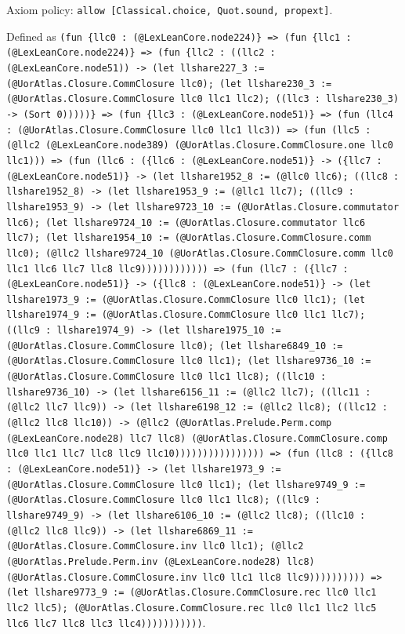 \documentclass[11pt]{article}
\begin{document}
\noindent Axiom policy: \texttt{allow [Classical.choice, Quot.sound, propext]}.\par
\noindent Defined as \texttt{(fun \{llc0 : (@LexLeanCore.node224)\} => (fun \{llc1 : (@LexLeanCore.node224)\} => (fun \{llc2 : ((llc2 : (@LexLeanCore.node51)) -> (let llshare227\_3 := (@UorAtlas.Closure.CommClosure llc0); (let llshare230\_3 := (@UorAtlas.Closure.CommClosure llc0 llc1 llc2); ((llc3 : llshare230\_3) -> (Sort 0)))))\} => (fun \{llc3 : (@LexLeanCore.node51)\} => (fun (llc4 : (@UorAtlas.Closure.CommClosure llc0 llc1 llc3)) => (fun (llc5 : (@llc2 (@LexLeanCore.node389) (@UorAtlas.Closure.CommClosure.one llc0 llc1))) => (fun (llc6 : (\{llc6 : (@LexLeanCore.node51)\} -> (\{llc7 : (@LexLeanCore.node51)\} -> (let llshare1952\_8 := (@llc0 llc6); ((llc8 : llshare1952\_8) -> (let llshare1953\_9 := (@llc1 llc7); ((llc9 : llshare1953\_9) -> (let llshare9723\_10 := (@UorAtlas.Closure.commutator llc6); (let llshare9724\_10 := (@UorAtlas.Closure.commutator llc6 llc7); (let llshare1954\_10 := (@UorAtlas.Closure.CommClosure.comm llc0); (@llc2 llshare9724\_10 (@UorAtlas.Closure.CommClosure.comm llc0 llc1 llc6 llc7 llc8 llc9)))))))))))) => (fun (llc7 : (\{llc7 : (@LexLeanCore.node51)\} -> (\{llc8 : (@LexLeanCore.node51)\} -> (let llshare1973\_9 := (@UorAtlas.Closure.CommClosure llc0 llc1); (let llshare1974\_9 := (@UorAtlas.Closure.CommClosure llc0 llc1 llc7); ((llc9 : llshare1974\_9) -> (let llshare1975\_10 := (@UorAtlas.Closure.CommClosure llc0); (let llshare6849\_10 := (@UorAtlas.Closure.CommClosure llc0 llc1); (let llshare9736\_10 := (@UorAtlas.Closure.CommClosure llc0 llc1 llc8); ((llc10 : llshare9736\_10) -> (let llshare6156\_11 := (@llc2 llc7); ((llc11 : (@llc2 llc7 llc9)) -> (let llshare6198\_12 := (@llc2 llc8); ((llc12 : (@llc2 llc8 llc10)) -> (@llc2 (@UorAtlas.Prelude.Perm.comp (@LexLeanCore.node28) llc7 llc8) (@UorAtlas.Closure.CommClosure.comp llc0 llc1 llc7 llc8 llc9 llc10)))))))))))))))) => (fun (llc8 : (\{llc8 : (@LexLeanCore.node51)\} -> (let llshare1973\_9 := (@UorAtlas.Closure.CommClosure llc0 llc1); (let llshare9749\_9 := (@UorAtlas.Closure.CommClosure llc0 llc1 llc8); ((llc9 : llshare9749\_9) -> (let llshare6106\_10 := (@llc2 llc8); ((llc10 : (@llc2 llc8 llc9)) -> (let llshare6869\_11 := (@UorAtlas.Closure.CommClosure.inv llc0 llc1); (@llc2 (@UorAtlas.Prelude.Perm.inv (@LexLeanCore.node28) llc8) (@UorAtlas.Closure.CommClosure.inv llc0 llc1 llc8 llc9)))))))))) => (let llshare9773\_9 := (@UorAtlas.Closure.CommClosure.rec llc0 llc1 llc2 llc5); (@UorAtlas.Closure.CommClosure.rec llc0 llc1 llc2 llc5 llc6 llc7 llc8 llc3 llc4)))))))))))}.\par
\end{document}
